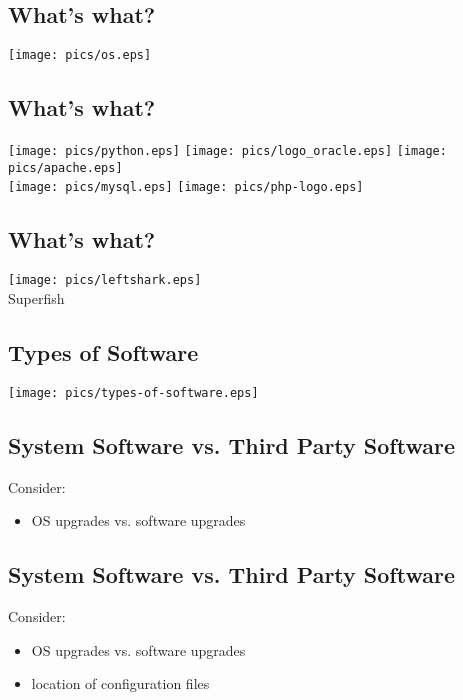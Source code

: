 \documentclass[xga]{xdvislides}
\begin{document}
\subsection{What's what?}
\begin{center}
	\texttt{[image: pics/os.eps]}
\end{center}

\subsection{What's what?}
\begin{center}
	\texttt{[image: pics/python.eps]}
	\texttt{[image: pics/logo\_oracle.eps]}
	\texttt{[image: pics/apache.eps]} \\
	\texttt{[image: pics/mysql.eps]}
	\texttt{[image: pics/php-logo.eps]}
\end{center}

\subsection{What's what?}
\begin{center}
	\texttt{[image: pics/leftshark.eps]} \\
Superfish
\end{center}

\subsection{Types of Software}
\vfill
\begin{center}
	\texttt{[image: pics/types-of-software.eps]}
\end{center}
\vfill




\subsection{System Software vs. Third Party Software}
Consider:
\begin{itemize}
	\item OS upgrades vs. software upgrades
\end{itemize}

\subsection{System Software vs. Third Party Software}
Consider:
\begin{itemize}
	\item OS upgrades vs. software upgrades
	\item location of configuration files
\end{itemize}
\end{document}
